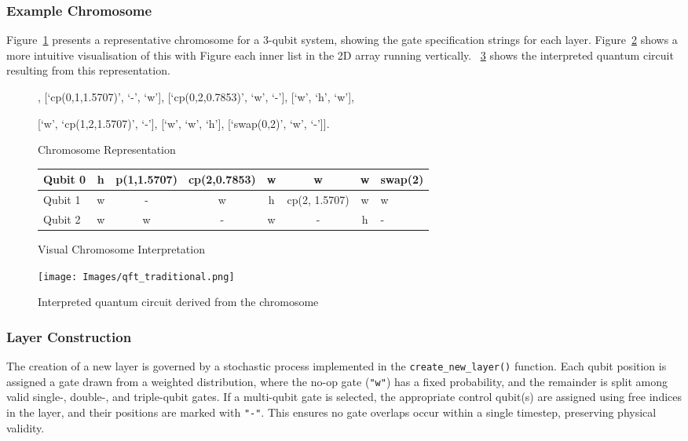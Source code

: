\documentclass[11pt,a4paper]{article}
\begin{document}
\subsubsection*{Example Chromosome} Figure~\ref{fig:chromosome_example} presents a representative chromosome for a 3-qubit system, showing the gate specification strings for each layer. Figure~\ref{fig:chromosome_matrix} shows a more intuitive visualisation of this with Figure each inner list in the 2D array running vertically. ~\ref{fig:chromosome_circuit} shows the interpreted quantum circuit resulting from this representation.

\begin{figure}[H]
    \centering
    [[‘h’, ‘w’, ‘w’], [‘cp(0,1,1.5707)’, ‘-’, ‘w’], [‘cp(0,2,0.7853)’, ‘w’, ‘-’], [‘w’, ‘h’, ‘w’],
    
    [‘w’, ‘cp(1,2,1.5707)’, ‘-’], [‘w’, ‘w’, ‘h’], [‘swap(0,2)’, ‘w’, ‘-’]].
    \caption{Chromosome Representation}
    \label{fig:chromosome_example}
\end{figure}

\begin{figure}[H]
    \centering
    \begin{tabular}{l | c c c c c c l}
        \toprule
        Qubit 0 & h & p(1,1.5707) & cp(2,0.7853) & w & w & w & swap(2) \\
        \midrule
        Qubit 1 & w & - & w & h & cp(2, 1.5707) & w & w\\
        \midrule
        Qubit 2 & w & w & - & w & - & h & - \\
        \bottomrule
    \end{tabular}
    \caption{Visual Chromosome Interpretation}
    \label{fig:chromosome_matrix}
\end{figure}

\begin{figure}[H]
    \centering
    \texttt{[image: Images/qft\_traditional.png]}
    \caption{Interpreted quantum circuit derived from the chromosome}
    \label{fig:chromosome_circuit}
\end{figure}

\subsubsection*{Layer Construction}
The creation of a new layer is governed by a stochastic process implemented in the \texttt{create\_new\_layer()} function. Each qubit position is assigned a gate drawn from a weighted distribution, where the no-op gate (\texttt{"w"}) has a fixed probability, and the remainder is split among valid single-, double-, and triple-qubit gates. If a multi-qubit gate is selected, the appropriate control qubit(s) are assigned using free indices in the layer, and their positions are marked with \texttt{"-"}. This ensures no gate overlaps occur within a single timestep, preserving physical validity.
\end{document}
